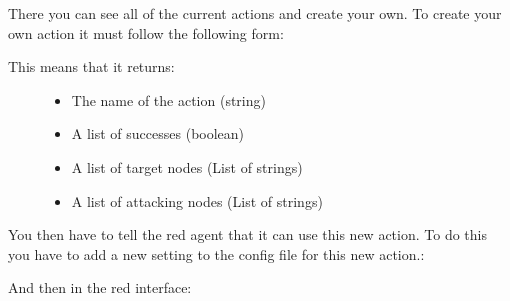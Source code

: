 \documentclass[letterpaper,10pt,english]{sphinxmanual}
\begin{document}
\sphinxAtStartPar
There you can see all of the current actions and create your own.
To create your own action it must follow the following form:

\begin{sphinxVerbatim}[commandchars=\\\{\}]
   \PYG{p}{[} \PYG{p}{[}\PYG{p}{]} \PYG{p}{[}\PYG{p}{[} \PYG{p}{]}\PYG{p}{]} \PYG{p}{[}\PYG{p}{[} \PYG{p}{]}\PYG{p}{]}\PYG{p}{]}
\end{sphinxVerbatim}
\begin{description}
\item[{This means that it returns:}] \leavevmode\begin{itemize}
\item {}
\sphinxAtStartPar
The name of the action (string)

\item {}
\sphinxAtStartPar
A list of successes (boolean)

\item {}
\sphinxAtStartPar
A list of target nodes (List of strings)

\item {}
\sphinxAtStartPar
A list of attacking nodes (List of strings)

\end{itemize}

\end{description}

\sphinxAtStartPar
You then have to tell the red agent that it can use this new action.
To do this you have to add a new setting to the config file for this new action.:

\begin{sphinxVerbatim}[commandchars=\\\{\}]
     
     
\end{sphinxVerbatim}

\sphinxAtStartPar
And then in the red interface:
\end{document}
